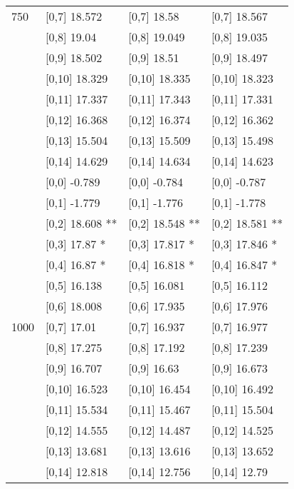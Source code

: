 \begin{table}
\begin{tabular}[t]{llll}
750 & {}[0,7] 18.572 & {}[0,7] 18.58 & {}[0,7] 18.567\\
 & {}[0,8] 19.04 & {}[0,8] 19.049 & {}[0,8] 19.035\\
 & {}[0,9] 18.502 & {}[0,9] 18.51 & {}[0,9] 18.497\\
\addlinespace
 & {}[0,10] 18.329 & {}[0,10] 18.335 & {}[0,10] 18.323\\
 & {}[0,11] 17.337 & {}[0,11] 17.343 & {}[0,11] 17.331\\
 & {}[0,12] 16.368 & {}[0,12] 16.374 & {}[0,12] 16.362\\
 & {}[0,13] 15.504 & {}[0,13] 15.509 & {}[0,13] 15.498\\
 & {}[0,14] 14.629 & {}[0,14] 14.634 & {}[0,14] 14.623\\
\addlinespace
 & {}[0,0] -0.789 & {}[0,0] -0.784 & {}[0,0] -0.787\\
 & {}[0,1] -1.779 & {}[0,1] -1.776 & {}[0,1] -1.778\\
 & {}[0,2] 18.608 ** & {}[0,2] 18.548 ** & {}[0,2] 18.581 **\\
 & {}[0,3] 17.87 * & {}[0,3] 17.817 * & {}[0,3] 17.846 *\\
 & {}[0,4] 16.87 * & {}[0,4] 16.818 * & {}[0,4] 16.847 *\\
\addlinespace
 & {}[0,5] 16.138 & {}[0,5] 16.081 & {}[0,5] 16.112\\
 & {}[0,6] 18.008 & {}[0,6] 17.935 & {}[0,6] 17.976\\
1000 & {}[0,7] 17.01 & {}[0,7] 16.937 & {}[0,7] 16.977\\
 & {}[0,8] 17.275 & {}[0,8] 17.192 & {}[0,8] 17.239\\
 & {}[0,9] 16.707 & {}[0,9] 16.63 & {}[0,9] 16.673\\
\addlinespace
 & {}[0,10] 16.523 & {}[0,10] 16.454 & {}[0,10] 16.492\\
 & {}[0,11] 15.534 & {}[0,11] 15.467 & {}[0,11] 15.504\\
 & {}[0,12] 14.555 & {}[0,12] 14.487 & {}[0,12] 14.525\\
 & {}[0,13] 13.681 & {}[0,13] 13.616 & {}[0,13] 13.652\\
 & {}[0,14] 12.818 & {}[0,14] 12.756 & {}[0,14] 12.79\\
\bottomrule
\end{tabular}
\end{table}
